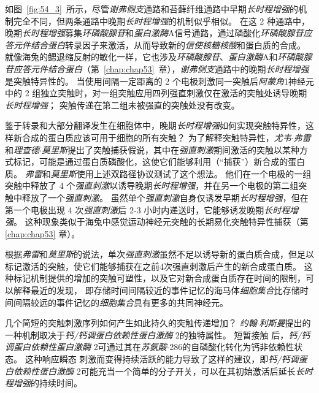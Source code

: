 如图~\ref{fig:54_3}~所示，尽管\textit{谢弗侧支}通路和苔藓纤维通路中早期\textit{长时程增强}的机制完全不同，但两条通路中晚期\textit{长时程增强}的机制似乎相似。
在这 2 种通路中，晚期\textit{长时程增强}募集\textit{环磷酸腺苷}和\textit{蛋白激酶}A信号通路，通过磷酸化\textit{环磷酸腺苷应答元件结合蛋白}转录因子来激活，从而导致新的\textit{信使核糖核酸}和蛋白质的合成。
就像海兔的鳃退缩反射的敏化一样，它也涉及\textit{环磷酸腺苷}、\textit{蛋白激酶}A和\textit{环磷酸腺苷应答元件结合蛋白}（第~\ref{chap:chap53}~章），\textit{谢弗侧支}通路中的晚期\textit{长时程增强}是突触特异性的。
当使用间隔一定距离的 2 个电极刺激同一突触后\textit{阿蒙角}1神经元中的 2 组独立突触时，对一组突触应用四列强直刺激仅在激活的突触处诱导晚期\textit{长时程增强}；
突触传递在第二组未被强直的突触处没有改变。


鉴于转录和大部分翻译发生在细胞体中，晚期\textit{长时程增强}如何实现突触特异性，这样新合成的蛋白质应该可用于细胞的所有突触？
为了解释突触特异性，\textit{尤韦$\cdot$弗雷}和\textit{理查德$\cdot$莫里斯}提出了突触捕获假说，其中在\textit{强直刺激}期间激活的突触以某种方式标记，可能是通过蛋白质磷酸化，这使它们能够利用（“捕获”）新合成的蛋白质。
\textit{弗雷}和\textit{莫里斯}使用上述双路径协议测试了这个想法。
他们在一个电极的一组突触中释放了 4 个\textit{强直刺激}以诱导晚期\textit{长时程增强}，并在另一个电极的第二组突触中释放了一个\textit{强直刺激}。
虽然单个\textit{强直刺激}自身仅诱发早期\textit{长时程增强}，但在第一个电极出现 4 次\textit{强直刺激}后 2-3 小时内递送时，它能够诱发晚期\textit{长时程增强}。
这种现象类似于海兔中感觉运动神经元突触的长期易化突触特异性捕获（第 \ref{chap:chap53} 章）。


根据\textit{弗雷}和\textit{莫里斯}的说法，单次\textit{强直刺激}虽然不足以诱导新的蛋白质合成，但足以标记激活的突触，使它们能够捕获在之前4次强直刺激后产生的新合成蛋白质。
这种标记机制提供的增加的突触可塑性，以及它对新合成蛋白质存在时间的限制，可以解释最近的发现，
即存储时间间隔较近的事件记忆的海马体\textit{细胞集合}比存储时间间隔较远的事件记忆的\textit{细胞集合}具有更多的共同神经元。


几个简短的突触刺激序列如何产生如此持久的突触传递增加？
\textit{约翰$\cdot$利斯曼}提出的一种机制取决于\textit{钙/钙调蛋白依赖性蛋白激酶} 2的独特属性。
短暂接触  后，\textit{钙/钙调蛋白依赖性蛋白激酶} 2可通过其在\textit{苏氨酸}-286的自磷酸化转化为钙非依赖性状态。
这种响应瞬态  刺激而变得持续活跃的能力导致了这样的建议，即\textit{钙/钙调蛋白依赖性蛋白激酶} 2可能充当一个简单的分子开关，可以在其初始激活后延长\textit{长时程增强}的持续时间。


